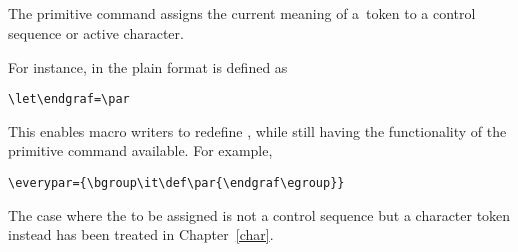 \subsection{\protect{}}
\label{let}

The primitive command  assigns the current meaning
of a~token to a control sequence or active character.

For instance, in the plain format  is defined
as
\begin{verbatim}
\let\endgraf=\par
\end{verbatim}
This enables macro writers to redefine , while
still having the functionality of the primitive 
command available. For example,
\begin{verbatim}
\everypar={\bgroup\it\def\par{\endgraf\egroup}}
\end{verbatim}

The case where the  to be assigned is not a control
sequence but a character token instead has been treated 
in Chapter~\ref{char}.

\subsection{\protect{}}

